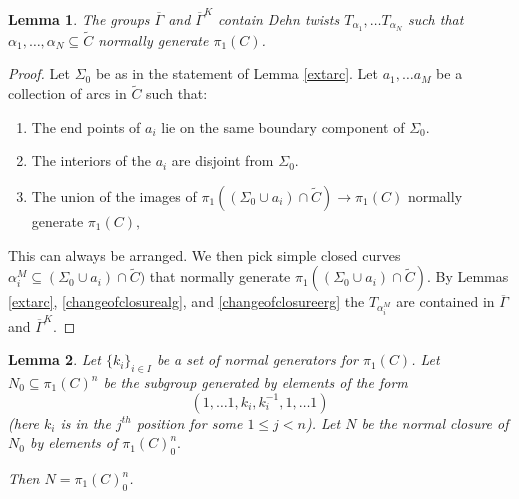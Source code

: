 \documentclass{article}
\newtheorem{lemma}{Lemma}[theorem]
\begin{document}
\begin{lemma}\label{contnormalpha}
 The groups $\overline{\Gamma}$ and $\overline{\Gamma}^K$ contain Dehn twists $T_{\alpha_1} ,\dots T_{\alpha_N}$ such that $\alpha_1 ,\dots , \alpha_N \subseteq \tilde C$ normally generate $\pi_1(C)$. 
\end{lemma}
\begin{proof}
    Let $\Sigma_0$ be as in the statement of Lemma \ref{extarc}. Let $a_1 ,\dots a_M$ be a collection of arcs in $\tilde C $  such that:
    \begin{enumerate}
        \item The end points of $a_i$ lie on the same boundary component of $\Sigma_0$.
        \item The interiors of the $a_i$ are disjoint from $\Sigma_0.$
        \item The union of the images of $\pi_1((\Sigma_0 \cup a_i)\cap \tilde C) \to \pi_1(C)$ normally generate $\pi_1(C),$ 
    \end{enumerate}
    This can always be arranged.  We then pick simple closed curves $\alpha_i^M \subseteq (\Sigma_0 \cup a_i)\cap \tilde C) $ that normally generate $\pi_1((\Sigma_0 \cup a_i)\cap \tilde C)$. By Lemmas \ref{extarc}, \ref{changeofclosurealg}, and \ref{changeofclosureerg} the $T_{\alpha_i^M}$ are contained in $\overline{\Gamma}$ and $\overline{\Gamma}^K.$

\end{proof}
\begin{lemma}\label{normgen}
    Let $\{k_i\}_{i\in I}$ be a set of normal generators for $\pi_1(C)$.
    Let $N_0 \subseteq \pi_1(C)^n$ be the subgroup   generated by elements of the form $$(1 , \dots 1 , k_i, k_i^{-1}, 1 ,\dots 1)$$ (here $k_i$ is in the $j^{th}$ position for some $1 \le j < n$). Let $N$ be the normal closure of $N_0$ by elements of $\pi_1(C)^n_0.$

    Then $N = \pi_1(C)^n_0$.
\end{lemma}
\end{document}
